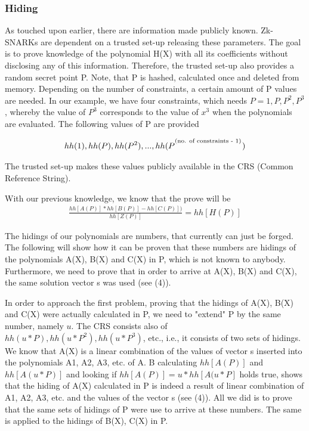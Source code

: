 \subsubsection{Hiding}
As touched upon earlier, there are information made publicly known. Zk-SNARKs are dependent on a trusted set-up releasing these parameters. The goal is to prove knowledge of the polynomial H(X) with all its coefficients without disclosing any of this information. Therefore, the trusted set-up also provides a random secret point P. Note, that P is hashed, calculated once and deleted from memory. Depending on the number of constraints, a certain amount of P values are needed. In our example, we have four constraints, which needs \(P = {1, P, P^2, P^3}\), whereby the value of \(P^3\) corresponds to the value of \(x^3\) when the polynomials are evaluated. The following values of P are provided

\begin{align}
    hh(1), hh(P), hh(P^2), ..., hh(P^\textsuperscript{(no. of constraints - 1)})
\end{align}

The trusted set-up makes these values publicly available in the CRS (Common Reference String).

With our previous knowledge, we know that the prove will be
\begin{align}
    \frac{hh[A(P)] * hh[B(P)] - hh[C(P)])}{hh[Z(P)]} = hh[H(P)]
\end{align}

The hidings of our polynomials are numbers, that currently can just be forged. The following will show how it can be proven that these numbers are hidings of the polynomials A(X), B(X) and C(X) in P, which is not known to anybody. Furthermore, we need to prove that in order to arrive at A(X), B(X) and C(X), the same solution vector s was used (see (4)). 

In order to approach the first problem, proving that the hidings of A(X),  B(X) and C(X) were actually calculated in P, we need to "extend" P by the same number, namely \(u\). The CRS consists also of \(hh(u*P), hh(u*P^2), hh(u*P^3)\), etc., i.e., it consists of two sets of hidings. We know that A(X) is a linear combination of the values of vector s inserted into the polynomials A1, A2, A3, etc. of A. B calculating \(hh[A(P)]\) and \(hh[A(u*P)]\) and looking if \(hh[A(P)] = u * hh[A(u*P]\) holds true, shows that the hiding of A(X) calculated in P is indeed a result of linear combination of A1, A2, A3, etc. and the values of the vector s (see (4)). All we did is to prove that the same sets of hidings of P were use to arrive at these numbers. The same is applied to the hidings of B(X), C(X) in P.

